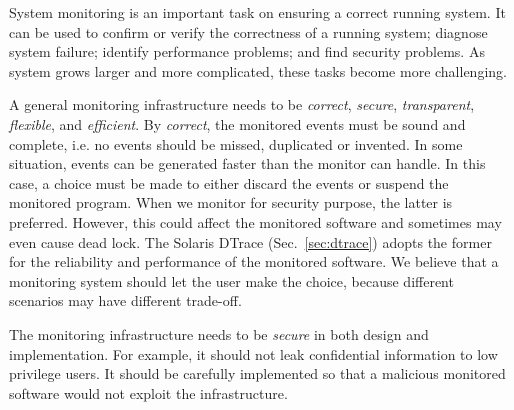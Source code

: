 System monitoring is an important task on ensuring a correct running
system.
It can be used to confirm or verify the correctness of a running system;
diagnose system failure;
identify performance problems;
and find security problems.
As system grows larger and more complicated, these tasks become more
challenging.

A general monitoring infrastructure needs to be
{\em correct}, {\em secure}, {\em transparent}, {\em flexible}, and {\em efficient}.
By {\em correct}, the monitored events must be sound and complete, i.e.
no events should be missed, duplicated or invented.
In some situation, events can be generated faster than the monitor can handle.
In this case, a choice must be made to either discard the events
or suspend the monitored program.
When we monitor for security purpose, the latter is preferred.
However, this could affect the monitored software and sometimes may even
cause dead lock.
The Solaris DTrace (Sec.~\ref{sec:dtrace}) adopts the former for the
reliability and performance of the monitored software.
We believe that a monitoring system should let the user make the choice,
because different scenarios may have different trade-off.

The monitoring infrastructure needs to be {\em secure} in both design and implementation.
For example, it should not leak confidential information to low privilege users.
It should be carefully implemented so that a malicious monitored
software would not exploit the infrastructure.

